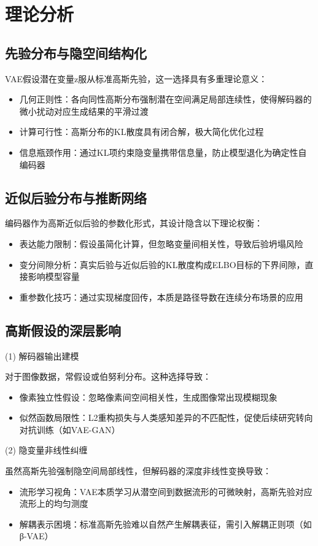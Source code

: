 \documentclass[12pt, a4paper, oneside]{ctexart}
\numberwithin{equation}{section}  %
\begin{document}
\section{理论分析}
\subsection{先验分布与隐空间结构化}
VAE假设潜在变量z服从标准高斯先验，这一选择具有多重理论意义：
\begin{itemize}
    \item 几何正则性：各向同性高斯分布强制潜在空间满足局部连续性，使得解码器的微小扰动对应生成结果的平滑过渡
    \item 计算可行性：高斯分布的KL散度具有闭合解，极大简化优化过程
    \item 信息瓶颈作用：通过KL项约束隐变量携带信息量，防止模型退化为确定性自编码器
\end{itemize}
\subsection{近似后验分布与推断网络}
编码器作为高斯近似后验的参数化形式，其设计隐含以下理论权衡：
\begin{itemize}
    \item 表达能力限制：假设虽简化计算，但忽略变量间相关性，导致后验坍塌风险
    \item 变分间隙分析：真实后验与近似后验的KL散度构成ELBO目标的下界间隙，直接影响模型容量
    \item 重参数化技巧：通过实现梯度回传，本质是路径导数在连续分布场景的应用
\end{itemize}
\subsection{高斯假设的深层影响}
(1) 解码器输出建模

对于图像数据，常假设或伯努利分布。这种选择导致：
\begin{itemize}
    \item 像素独立性假设：忽略像素间空间相关性，生成图像常出现模糊现象
    \item 似然函数局限性：L2重构损失与人类感知差异的不匹配性，促使后续研究转向对抗训练（如VAE-GAN）
\end{itemize}
(2) 隐变量非线性纠缠

虽然高斯先验强制隐空间局部线性，但解码器的深度非线性变换导致：
\begin{itemize}
    \item 流形学习视角：VAE本质学习从潜空间到数据流形的可微映射，高斯先验对应流形上的均匀测度
    \item 解耦表示困境：标准高斯先验难以自然产生解耦表征，需引入解耦正则项（如β-VAE）
\end{itemize}
\end{document}
